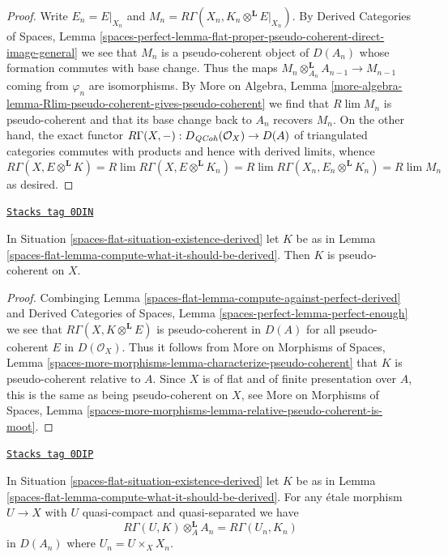 \begin{proof}
Write $E_n = E|_{X_n}$ and
$M_n = R\Gamma(X_n, K_n \otimes^\mathbf{L} E|_{X_n})$.
By Derived Categories of Spaces, Lemma
\ref{spaces-perfect-lemma-flat-proper-pseudo-coherent-direct-image-general}
we see that $M_n$ is a pseudo-coherent object of $D(A_n)$
whose formation commutes with base change. Thus the maps
$M_n \otimes_{A_n}^\mathbf{L} A_{n - 1} \to M_{n - 1}$
coming from $\varphi_n$ are isomorphisms. By
More on Algebra, Lemma
\ref{more-algebra-lemma-Rlim-pseudo-coherent-gives-pseudo-coherent}
we find that $R\lim M_n$ is pseudo-coherent and
that its base change back to $A_n$ recovers $M_n$.
On the other hand, the exact functor
$R\Gamma(X, -) : D_{\mathit{QCoh}}(\mathcal{O}_X) \to D(A)$
of triangulated categories commutes with products
and hence with derived limits, whence
$$
R\Gamma(X, E \otimes^\mathbf{L} K) =
R\lim R\Gamma(X,  E \otimes^\mathbf{L} K_n) =
R\lim R\Gamma(X_n, E_n \otimes^\mathbf{L} K_n) =
R\lim M_n
$$
as desired.
\end{proof}

\begin{lemma}
\label{spaces-flat-lemma-relative-pseudo-coherence-derived}
\href{https://stacks.math.columbia.edu/tag/0DIN}{\texttt{Stacks tag 0DIN}}

In Situation \ref{spaces-flat-situation-existence-derived} let $K$ be as in
Lemma \ref{spaces-flat-lemma-compute-what-it-should-be-derived}. Then $K$
is pseudo-coherent on $X$.
\end{lemma}

\begin{proof}
Combinging Lemma \ref{spaces-flat-lemma-compute-against-perfect-derived} and
Derived Categories of Spaces, Lemma
\ref{spaces-perfect-lemma-perfect-enough}
we see that $R\Gamma(X, K \otimes^\mathbf{L} E)$
is pseudo-coherent in $D(A)$ for all pseudo-coherent
$E$ in $D(\mathcal{O}_X)$. Thus it follows from
More on Morphisms of Spaces, Lemma
\ref{spaces-more-morphisms-lemma-characterize-pseudo-coherent}
that $K$ is pseudo-coherent relative to $A$.
Since $X$ is of flat and of finite presentation
over $A$, this is the same as being pseudo-coherent on $X$, see
More on Morphisms of Spaces, Lemma
\ref{spaces-more-morphisms-lemma-relative-pseudo-coherent-is-moot}.
\end{proof}

\begin{lemma}
\label{spaces-flat-lemma-compute-over-affine-derived}
\href{https://stacks.math.columbia.edu/tag/0DIP}{\texttt{Stacks tag 0DIP}}

In Situation \ref{spaces-flat-situation-existence-derived} let $K$ be as in
Lemma \ref{spaces-flat-lemma-compute-what-it-should-be-derived}. For any
\'etale morphism $U \to X$ with $U$ quasi-compact and quasi-separated we have
$$
R\Gamma(U, K) \otimes_A^\mathbf{L} A_n =
R\Gamma(U_n, K_n)
$$
in $D(A_n)$ where $U_n = U \times_X X_n$.
\end{lemma}

